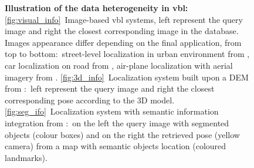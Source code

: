 \begin{figure}[!ht]
\begin{minipage}[b]{0.55\linewidth}
	\end{minipage}
	\caption[Illustration of the data heterogeneity in \ac{vbl}]{\textbf{Illustration of the data heterogeneity in \ac{vbl}:} \ref{fig:visual_info}~Image-based \ac{vbl} systems, left represent the query image and right the closest corresponding image in the database. Images appearance differ depending on the final application, from top to bottom:~street-level localization in urban environment from \citep{Torii2015}, car localization on road from \citep{Milford2012}, air-plane localization with aerial imagery from \citep{Wan2016}. \ref{fig:3d_info}~Localization system built upon a DEM from \citep{Matei2013}:~left represent the query image and right the closest corresponding pose according to the 3D model. \ref{fig:seg_ifo}~Localization system with semantic information integration from \citep{Ardeshir2014}:~on the left the query image with segmented objects (colour boxes) and on the right the retrieved pose (yellow camera) from a map with semantic objects location (coloured landmarks). \label{fig:data_div}}
\end{figure}